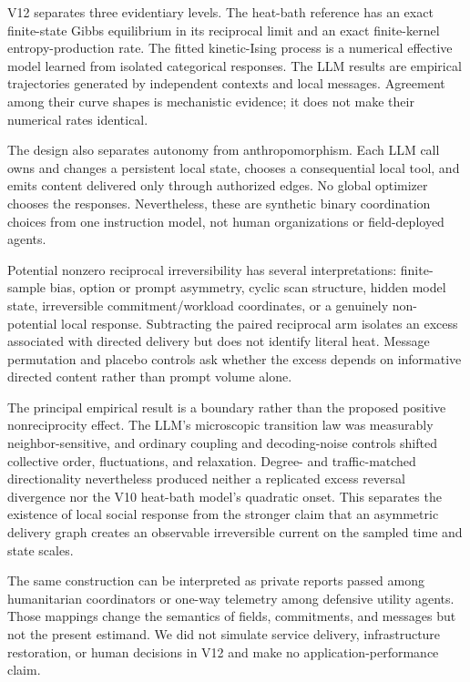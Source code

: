 \documentclass[12pt]{article}
\begin{document}
V12 separates three evidentiary levels. The heat-bath reference has an exact
finite-state Gibbs equilibrium in its reciprocal limit and an exact
finite-kernel entropy-production rate. The fitted kinetic-Ising process is a
numerical effective model learned from isolated categorical responses. The LLM
results are empirical trajectories generated by independent contexts and local
messages. Agreement among their curve shapes is mechanistic evidence; it does
not make their numerical rates identical.

The design also separates autonomy from anthropomorphism. Each LLM call owns and
changes a persistent local state, chooses a consequential local tool, and emits
content delivered only through authorized edges. No global optimizer chooses
the responses. Nevertheless, these are synthetic binary coordination choices
from one instruction model, not human organizations or field-deployed agents.

Potential nonzero reciprocal irreversibility has several interpretations:
finite-sample bias, option or prompt asymmetry, cyclic scan structure, hidden
model state, irreversible commitment/workload coordinates, or a genuinely
non-potential local response. Subtracting the paired reciprocal arm isolates an
excess associated with directed delivery but does not identify literal heat.
Message permutation and placebo controls ask whether the excess depends on
informative directed content rather than prompt volume alone.

The principal empirical result is a boundary rather than the proposed positive
nonreciprocity effect. The LLM's microscopic transition law was measurably
neighbor-sensitive, and ordinary coupling and decoding-noise controls shifted
collective order, fluctuations, and relaxation. Degree- and traffic-matched
directionality nevertheless produced neither a replicated excess reversal
divergence nor the V10 heat-bath model's quadratic onset. This separates the
existence of local social response from the stronger claim that an asymmetric
delivery graph creates an observable irreversible current on the sampled time
and state scales.

The same construction can be interpreted as private reports passed among
humanitarian coordinators or one-way telemetry among defensive utility agents.
Those mappings change the semantics of fields, commitments, and messages but
not the present estimand. We did not simulate service delivery, infrastructure
restoration, or human decisions in V12 and make no application-performance
claim.
\end{document}
